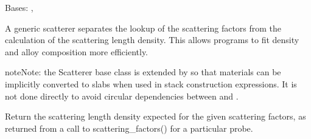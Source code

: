 \documentclass[letterpaper,10pt,english]{sphinxmanual}
\begin{document}

\begin{fulllineitems}
\label{api/material:refl1d.material.Scatterer}
Bases: , 

A generic scatterer separates the lookup of the scattering factors
from the calculation of the scattering length density.  This allows
programs to fit density and alloy composition more efficiently.

\begin{notice}{note}{Note:}
the Scatterer base class is extended by
 so that materials
can be implicitly converted to slabs when used in stack construction
expressions. It is not done directly to avoid circular dependencies
between {\hyperref[api/model:module-refl1d.model]{}} and {\hyperref[api/material:module-refl1d.material]{}}.
\end{notice}

\begin{fulllineitems}
\label{api/material:refl1d.material.Scatterer.sld}
Return the scattering length density expected for the given
scattering factors, as returned from a call to scattering\_factors()
for a particular probe.

\end{fulllineitems}


\end{fulllineitems}

\end{document}
